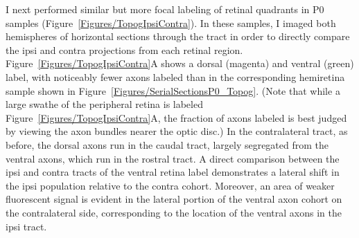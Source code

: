 I next performed similar but more focal labeling of retinal quadrants in P0 samples (Figure~\ref{Figures/TopogIpsiContra}).
In these samples, I imaged both hemispheres of horizontal sections through the tract in order to directly compare the ipsi and contra projections from each retinal region.
Figure~\ref{Figures/TopogIpsiContra}A shows a dorsal (magenta) and ventral (green) label, with noticeably fewer axons labeled than in the corresponding hemiretina sample shown in Figure~\ref{Figures/SerialSectionsP0_Topog}.
(Note that while a large swathe of the peripheral retina is labeled Figure~\ref{Figures/TopogIpsiContra}A, the fraction of axons labeled is best judged by viewing the axon bundles nearer the optic disc.)
In the contralateral tract, as before, the dorsal axons run in the caudal tract, largely segregated from the ventral axons, which run in the rostral tract.
A direct comparison between the ipsi and contra tracts of the ventral retina label demonstrates a lateral shift in the ipsi population relative to the contra cohort.
Moreover, an area of weaker fluorescent signal is evident in the lateral portion of the ventral axon cohort on the contralateral side, corresponding to the location of the ventral axons in the ipsi tract.
